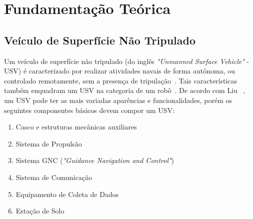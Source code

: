 


\chapter{Fundamentação Teórica}\label{chap2:fund_teo}
    
    \section{Veículo de Superfície Não Tripulado}\label{subchap2:USV}
        Um veículo de superfície não tripulado (do inglês \textit{"Unmanned Surface Vehicle"} - USV) é caracterizado por realizar atividades navais de forma autônoma, ou controlado remotamente, sem a presença de tripulação~\cite{LIU201671}. Tais características também enquadram um USV na categoria de um robô~\cite{JURAK2020}.
        De acordo com Liu \etal~\cite{LIU201671}, um USV pode ter as mais variadas aparências e funcionalidades, porém os seguintes componentes básicos devem compor um USV:
        
        \begin{enumerate}
            \item Casco e estruturas mecânicas auxiliares
            \item Sistema de Propulsão
            \item Sistema GNC (\textit{"Guidance Navigation and Control"})
            \item Sistema de Comunicação
            \item Equipamento de Coleta de Dados
            \item Estação de Solo
        \end{enumerate}
        
